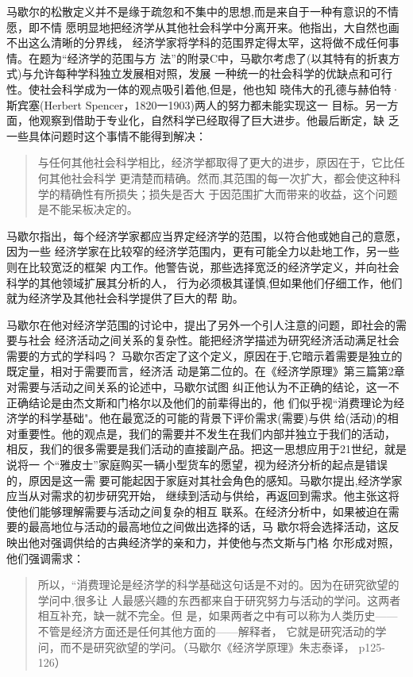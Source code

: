 马歇尔的松散定义并不是缘于疏忽和不集中的思想,而是来自于一种有意识的不情愿，即不情
愿明显地把经济学从其他社会科学中分离开来。他指出，大自然也画不出这么清晰的分界线，
经济学家将学科的范围界定得太罕，这将做不成任何事情。在题为“经济学的范围与方
法”的附录C中，马歇尔考虑了(以其特有的折衷方式)与允许每种学科独立发展相对照，发展
一种统一的社会科学的优缺点和可行性。使社会科学成为一体的观点吸引着他,但是，他也知
晓伟大的孔德与赫伯特·斯宾塞(Herbert Spencer，1820一1903)两人的努力都未能实现这一
目标。另一方面，他观察到借助于专业化，自然科学已经取得了巨大进步。他最后断定，缺
乏一些具体问题时这个事情不能得到解决：
\begin{quotation}
  与任何其他社会科学相比，经济学都取得了更大的进步，原因在于，它比任何其他社会科学
  更清楚而精确。然而,其范围的每一次扩大，都会使这种科学的精确性有所损失；损失是否大
  于因范围扩大而带来的收益，这个问题是不能呆板决定的。
\end{quotation}

马歇尔指出，每个经济学家都应当界定经济学的范围，以符合他或她自己的意愿，因为一些
经济学家在比较窄的经济学范围内，更有可能全力以赴地工作，另一些则在比较宽泛的框架
内工作。他警告说，那些选择宽泛的经济学定义，并向社会科学的其他领域扩展其分析的人，
行为必须极其谨慎,但如果他们仔细工作，他们就为经济学及其他社会科学提供了巨大的帮
助。

马歇尔在他对经济学范围的讨论中，提出了另外一个引人注意的问题，即社会的需要与社会
经济活动之间关系的复杂性。能把经济学描述为研究经济活动满足社会需要的方式的学科吗？
马歇尔否定了这个定义，原因在于,它暗示着需要是独立的既定量，相对于需要而言，经济活
动是第二位的。在《经济学原理》第三篇第2章对需要与活动之间关系的论述中，马歇尔试图
纠正他认为不正确的结论，这一不正确结论是由杰文斯和门格尔以及他们的前辈得出的，他
们似乎视“消费理论为经济学的科学基础"。他在最宽泛的可能的背景下评价需求(需要)与供
给(活动)的相对重要性。他的观点是，我们的需要并不发生在我们内部并独立于我们的活动，
相反，我们的很多需要是我们活动的直接副产品。把这一思想应用于21世纪，就是说将一
个“雅皮士”家庭购买一辆小型货车的愿望，视为经济分析的起点是错误的，原因是这一需
要可能起因于家庭对其社会角色的感知。马歇尔提出,经济学家应当从对需求的初步研究开始，
继续到活动与供给，再返回到需求。他主张这将使他们能够理解需要与活动之间复杂的相互
联系。在经济分析中，如果被迫在需要的最高地位与活动的最高地位之间做出选择的话，马
歇尔将会选择活动，这反映出他对强调供给的古典经济学的亲和力，并使他与杰文斯与门格
尔形成对照，他们强调需求：
\begin{quotation}
  所以，“消费理论是经济学的科学基础这句话是不对的。因为在研究欲望的学问中,很多让
  人最感兴趣的东西都来自于研究努力与活动的学问。这两者相互补充，缺一就不完全。但
  是，如果两者之中有可以称为人类历史——不管是经济方面还是任何其他方面的——解释者，
  它就是研究活动的学问，而不是研究欲望的学问。（马歇尔《经济学原理》朱志泰译，
  p125-126）
\end{quotation}

